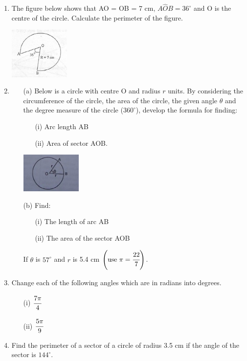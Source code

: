 \begin{enumerate}
	\item The figure below shows that AO = OB = 7 cm, $A\hat{O}B = 36^\circ$ and O is the centre of the circle. Calculate the perimeter of the figure.
	\begin{center}
	\includegraphics[width=3cm]{./img/circ17.jpg}
	\end{center}
	
	\item 
		\begin{itemize}
		\item[(a)] Below is a circle with centre O and radius $r$ units. By considering the circumference of the circle, the area of the circle, the given angle $\theta$ and the degree measure of the circle ($360^\circ$), develop the formula for finding:
		\begin{itemize}
		\item[(i)] Arc length AB
		\item[(ii)] Area of sector AOB.
		\end{itemize}
	\begin{center}
	\includegraphics[width=3cm]{./img/circ18.jpg}
	\end{center}
	
		\item[(b)] Find:
			\begin{itemize}
			\item[(i)] The length of arc AB
			\item[(ii)] The area of the sector AOB
			\end{itemize}			 
			If $\theta$ is $57^\circ$ and $r$ is 5.4 cm $\left(\text{use } \pi = \cfrac{22}{7}\right)$.
			\end{itemize}
			
	\item Change each of the following angles which are in radians into degrees.
		\begin{itemize}
		\item[(i)] $\cfrac{7\pi}{4}$
		\item[(ii)] $\cfrac{5\pi}{9}$
		\end{itemize}
		
	\item Find the perimeter of a sector of a circle of radius 3.5 cm if the angle of the sector is $144^\circ$.

\end{enumerate}	
	
